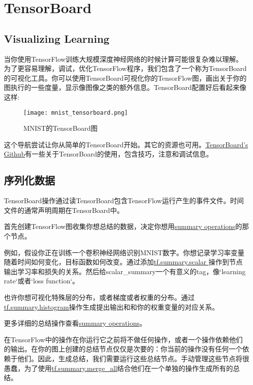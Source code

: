\section{TensorBoard}
 \subsection{Visualizing Learning}
 当你使用TensorFlow训练大规模深度神经网络的时候计算可能很复杂难以理解。为了更容易理解，调试，优化TensorFlow程序，我们包含了一个称为TensorBoard的可视化工具。你可以使用TensorBoard可视化你的TensorFlow图，画出关于你的图执行的一些度量，显示像图像之类的额外信息。TensorBoard配置好后看起来像这样:
 \begin{figure}[!ht]
 \centering
 \texttt{[image: mnist\_tensorboard.png]}
 \caption{MNIST的TensorBoard图}
 \end{figure}
 这个导航尝试让你从简单的TensorBoard开始。其它的资源也可用。\href{https://github.com/tensorflow/tensorboard}{TensorBoard's Github}有一些关于TensorBoard的使用，包含技巧，注意和调试信息。
 
 \subsection{序列化数据}
 TensorBoard操作通过读TensorBoard包含TensorFlow运行产生的事件文件。时间文件的通常声明周期在TensorBoard中。
 
 首先创建TensorFlow图收集你想总结的数据，决定你想用\href{https://www.tensorflow.org/api_guides/python/summary}{summary operations}的那个节点。
 
 例如，假设你正在训练一个卷积神经网络识别MNIST数字。你想记录学习率变量随着时间如何变化，目标函数如何改变。通过添加\href{https://www.tensorflow.org/api_docs/python/tf/summary/scalar}{tf.summary.scalar }操作到节点输出学习率和损失的关系。然后给scalar\_summary一个有意义的tag，像`learning rate`或者`loss function`。
 
 也许你想可视化特殊层的分布，或者梯度或者权重的分布。通过\href{https://www.tensorflow.org/api_docs/python/tf/summary/histogram}{tf.summary.histogram}操作生成提出输出和和你的权重变量的对应关系。
 
 更多详细的总结操作查看\href{https://www.tensorflow.org/api_guides/python/summary}{summary operations}。
 
 在TensorFlow中的操作在你运行它之前将不做任何操作，或者一个操作依赖他们的输出。在你的图上创建的总结节点仅仅是次要的：你当前的操作没有任何一个依赖于他们。因此，生成总结，我们需要运行这些总结节点。手动管理这些节点将很愚蠢，为了使用\href{https://www.tensorflow.org/api_docs/python/tf/summary/merge_all}{tf.summary.merge\_all}结合他们在一个单独的操作生成所有的总结。
 
